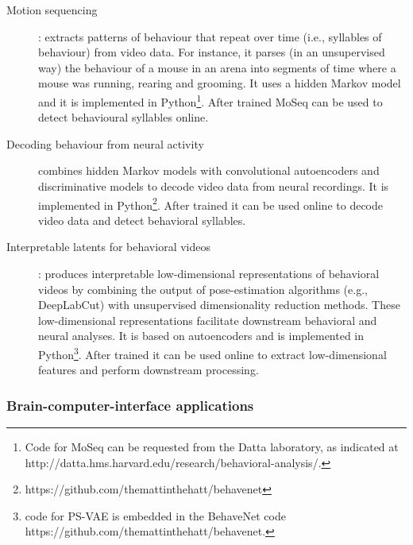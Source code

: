 \begin{description}

    \item[Motion sequencing]\citep[MoSeq;][]{wiltschkoEtAl15}: extracts patterns
        of behaviour that repeat over time (i.e., syllables of behaviour) from
        video data. For instance, it parses (in an unsupervised way) the
        behaviour of a mouse in an arena into segments of time where a mouse
        was running, rearing and grooming. It uses a hidden Markov model and it
        is implemented in Python\footnote{Code for MoSeq can be requested from
        the Datta laboratory, as indicated at
        http://datta.hms.harvard.edu/research/behavioral-analysis/.}.
        After trained MoSeq can be used to detect behavioural syllables online.

    \item[Decoding behaviour from neural
        activity]\citep[BehaveNet;][]{battyEtAl19} combines hidden Markov
        models with convolutional autoencoders and discriminative models to
        decode video data from neural recordings. It is implemented in
        Python\footnote{https://github.com/themattinthehatt/behavenet}.
        After trained it can be used online to decode video data and detect
        behavioral syllables.

    \item[Interpretable latents for behavioral videos]\citep[Partitioned
        Subspace Variational Autoencoder, PS-VAE;][]{whitewayEtAl21}: produces
        interpretable low-dimensional representations of behavioral videos by
        combining the output of pose-estimation algorithms (e.g., DeepLabCut)
        with unsupervised dimensionality reduction methods. These
        low-dimensional representations facilitate downstream behavioral and
        neural analyses. It is based on autoencoders and is implemented in
        Python\footnote{code for PS-VAE is embedded in the BehaveNet code\\ 
        https://github.com/themattinthehatt/behavenet.%
        }. After trained it can be used
        online to extract low-dimensional features and perform downstream
        processing.

\end{description}

\subsubsection{Brain-computer-interface applications}
\label{sec:bci}


